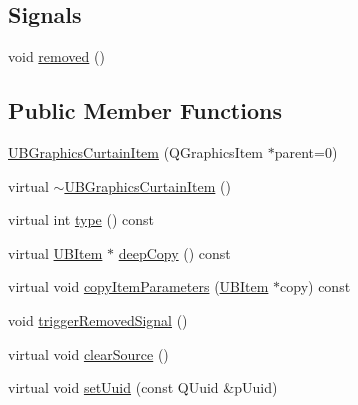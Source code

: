 \subsection*{Signals}
\begin{DoxyCompactItemize}
\item 
void \hyperlink{class_u_b_graphics_curtain_item_a50b31910c33ce9a271059f5be362a9dc}{removed} ()
\end{DoxyCompactItemize}
\subsection*{Public Member Functions}
\begin{DoxyCompactItemize}
\item 
\hyperlink{class_u_b_graphics_curtain_item_af21004fb36e7ea0cbc52997bf97e9552}{U\-B\-Graphics\-Curtain\-Item} (Q\-Graphics\-Item $\ast$parent=0)
\item 
virtual \hyperlink{class_u_b_graphics_curtain_item_ad51d1c1cefdc27352b560a022abdbee8}{$\sim$\-U\-B\-Graphics\-Curtain\-Item} ()
\item 
virtual int \hyperlink{class_u_b_graphics_curtain_item_a9baa6c0e4b07156dbe21d1a15181516d}{type} () const 
\item 
virtual \hyperlink{class_u_b_item}{U\-B\-Item} $\ast$ \hyperlink{class_u_b_graphics_curtain_item_ad19bcb248c88c2111d95122ccd2b5a59}{deep\-Copy} () const 
\item 
virtual void \hyperlink{class_u_b_graphics_curtain_item_a8378742b3277026ab68263bedb11c407}{copy\-Item\-Parameters} (\hyperlink{class_u_b_item}{U\-B\-Item} $\ast$copy) const 
\item 
void \hyperlink{class_u_b_graphics_curtain_item_a4f068ab0666e7b1f604666071844300b}{trigger\-Removed\-Signal} ()
\item 
virtual void \hyperlink{class_u_b_graphics_curtain_item_a5657328df5d7685e3936964f33dce06e}{clear\-Source} ()
\item 
virtual void \hyperlink{class_u_b_graphics_curtain_item_aa1d6ddfc26a642ef1bac6d256be9cb84}{set\-Uuid} (const Q\-Uuid \&p\-Uuid)
\end{DoxyCompactItemize}
